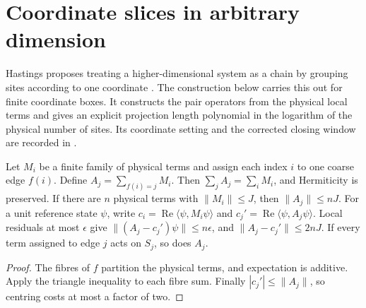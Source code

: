 \section{Coordinate slices in arbitrary dimension}
\label{sec:hastings05_coordinate_slices}

Hastings proposes treating a higher-dimensional system as a chain by grouping
sites according to one coordinate \cite[lines 745--756]{Hastings2006Solving}.
The construction below carries this out for finite coordinate boxes. It
constructs the pair operators from the physical local terms and gives an
explicit projection length polynomial in the logarithm of the physical number
of sites. Its coordinate setting and the corrected closing window are recorded
in \cite{gap:hastings05_coordinate_slices,gap:hastings05_hierarchical_energy}.

\begin{definition}
    \label{def:hastings05_edge_partition}
    \leanok
    Let $M_i$ be a finite family of physical terms and assign each index $i$
    to one coarse edge $f(i)$. Define $A_j=\sum_{f(i)=j}M_i$.
    Then $\sum_jA_j=\sum_iM_i$, and Hermiticity is preserved.
    If there are $n$ physical terms with $\|M_i\|\le J$, then
    $\|A_j\|\le nJ$. For a unit reference state $\psi$, write
    $c_i=\operatorname{Re}\langle\psi,M_i\psi\rangle$ and
    $c_j'=\operatorname{Re}\langle\psi,A_j\psi\rangle$.
    Local residuals at most $\epsilon$ give
    $\|(A_j-c_j')\psi\|\le n\epsilon$, and
    $\|A_j-c_j'\|\le2nJ$.
    If every term assigned to edge $j$ acts on $S_j$, so does $A_j$.
\end{definition}
\begin{proof}\leanok
    The fibres of $f$ partition the physical terms, and expectation is
    additive. Apply the triangle inequality to each fibre sum. Finally
    $|c_j'|\le\|A_j\|$, so centring costs at most a factor of two.
\end{proof}


